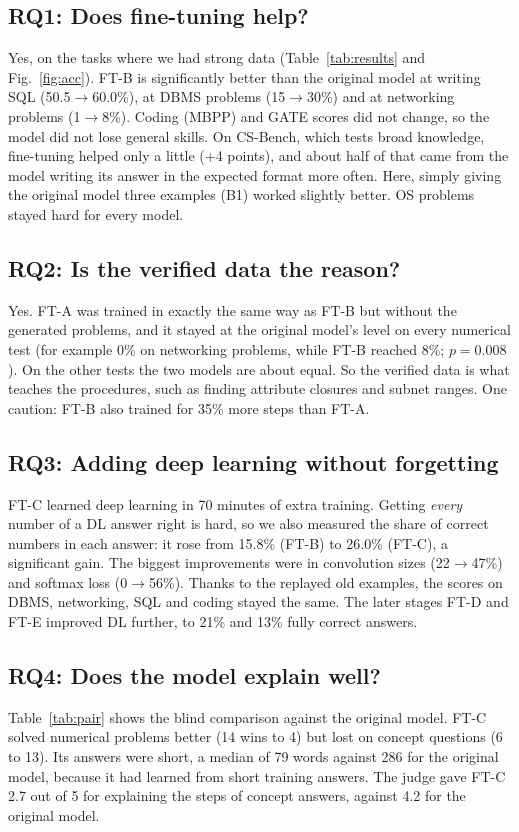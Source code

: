 \documentclass[conference]{IEEEtran}
\newcommand{\ra}{$\rightarrow$}
\begin{document}
\subsection{RQ1: Does fine-tuning help?}
Yes, on the tasks where we had strong data (Table~\ref{tab:results} and Fig.~\ref{fig:acc}). FT-B is significantly better than the original model at writing SQL (50.5\ra 60.0\%), at DBMS problems (15\ra 30\%) and at networking problems (1\ra 8\%). Coding (MBPP) and GATE scores did not change, so the model did not lose general skills. On CS-Bench, which tests broad knowledge, fine-tuning helped only a little (+4 points), and about half of that came from the model writing its answer in the expected format more often. Here, simply giving the original model three examples (B1) worked slightly better. OS problems stayed hard for every model.

\subsection{RQ2: Is the verified data the reason?}
Yes. FT-A was trained in exactly the same way as FT-B but without the generated problems, and it stayed at the original model's level on every numerical test (for example 0\% on networking problems, while FT-B reached 8\%; $p=0.008$). On the other tests the two models are about equal. So the verified data is what teaches the procedures, such as finding attribute closures and subnet ranges. One caution: FT-B also trained for 35\% more steps than FT-A.

\subsection{RQ3: Adding deep learning without forgetting}
FT-C learned deep learning in 70 minutes of extra training. Getting \emph{every} number of a DL answer right is hard, so we also measured the share of correct numbers in each answer: it rose from 15.8\% (FT-B) to 26.0\% (FT-C), a significant gain. The biggest improvements were in convolution sizes (22\ra 47\%) and softmax loss (0\ra 56\%). Thanks to the replayed old examples, the scores on DBMS, networking, SQL and coding stayed the same. The later stages FT-D and FT-E improved DL further, to 21\% and 13\% fully correct answers.

\subsection{RQ4: Does the model explain well?}
Table~\ref{tab:pair} shows the blind comparison against the original model. FT-C solved numerical problems better (14 wins to 4) but lost on concept questions (6 to 13). Its answers were short, a median of 79 words against 286 for the original model, because it had learned from short training answers. The judge gave FT-C 2.7 out of 5 for explaining the steps of concept answers, against 4.2 for the original model.
\end{document}

